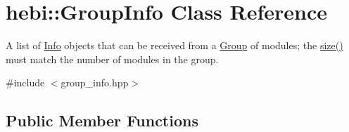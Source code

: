 \hypertarget{classhebi_1_1GroupInfo}{}\section{hebi\+:\+:Group\+Info Class Reference}
\label{classhebi_1_1GroupInfo}


A list of \hyperlink{classhebi_1_1Info}{Info} objects that can be received from a \hyperlink{classhebi_1_1Group}{Group} of modules; the \hyperlink{classhebi_1_1GroupInfo_a197165d1017e42ebbf4f9c527bb1b706}{size()} must match the number of modules in the group.  




{\ttfamily \#include $<$group\+\_\+info.\+hpp$>$}

\subsection*{Public Member Functions}

